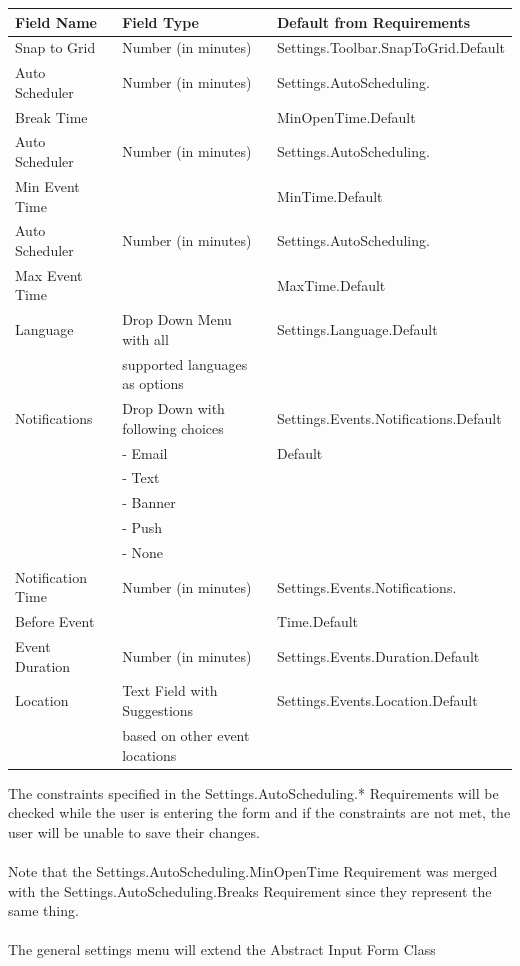 \documentclass{scrreprt}
\begin{document}
\begin{center}
\begin{longtable}{ | p{3cm} | p{6cm} | p{6cm} | }
\hline
\textbf{Field Name} & \textbf{Field Type} & \textbf{Default from Requirements} \\
\hline
Snap to Grid & Number (in minutes) & Settings.Toolbar.SnapToGrid.Default \\
\hline
Auto Scheduler & Number (in minutes) & Settings.AutoScheduling. \\
Break Time & & MinOpenTime.Default\\
\hline
Auto Scheduler & Number (in minutes) & Settings.AutoScheduling. \\
Min Event Time & & MinTime.Default\\
\hline
Auto Scheduler & Number (in minutes) & Settings.AutoScheduling. \\
Max Event Time & & MaxTime.Default\\
\hline
Language & Drop Down Menu with all & Settings.Language.Default \\
& supported languages as options & \\
\hline
Notifications & Drop Down with following choices & Settings.Events.Notifications.Default \\
& - Email & Default\\
& - Text & \\
& - Banner & \\
& - Push & \\
& - None & \\
\hline
Notification Time & Number (in minutes) & Settings.Events.Notifications. \\
Before Event & & Time.Default \\
\hline
Event Duration & Number (in minutes) & Settings.Events.Duration.Default \\
\hline
Location & Text Field with Suggestions & Settings.Events.Location.Default \\
& based on other event locations & \\
\hline
\end{longtable}
\end{center}
The constraints specified in the Settings.AutoScheduling.* Requirements will be checked while the user is entering the form and if the constraints are not met, the user will be unable to save their changes.
\\\\
Note that the Settings.AutoScheduling.MinOpenTime Requirement was merged with the Settings.AutoScheduling.Breaks Requirement since they represent the same thing.
\\\\
The general settings menu will extend the Abstract Input Form Class
\end{document}
